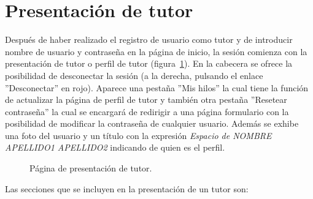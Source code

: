 \documentclass[a4paper, 12pt]{book}
\begin{document}
\section{Presentaci\'on de tutor}
\label{app:presentaciontutor}
Despu\'es de haber realizado el registro de usuario como tutor y de introducir nombre de usuario y contrase\~na en la p\'agina de inicio, la sesi\'on 
comienza con la presentaci\'on de tutor o perfil de tutor (figura~\ref{figura:tutor}). En la cabecera se ofrece la posibilidad de desconectar la sesi\'on (a la derecha, pulsando el 
enlace ''Desconectar'' en rojo). Aparece una pesta\~na ''Mis hilos'' la cual tiene la funci\'on de actualizar la p\'agina de perfil 
de tutor y tambi\'en otra pesta\~na ''Resetear contrase\~na'' la cual se encargar\'a de redirigir a una p\'agina formulario con la posibilidad de
modificar la contrase\~na de cualquier usuario. Adem\'as se exhibe una foto del usuario y un t\'itulo con la expresi\'on 
\textit{Espacio de NOMBRE APELLIDO1 APELLIDO2} indicando de quien es el perfil.

\begin{figure}[htbp] 
  \centering
  \caption{P\'agina de presentaci\'on de tutor.}
  \label{figura:tutor}
\end{figure}

Las secciones que se incluyen en la presentaci\'on de un tutor son:
\end{document}
